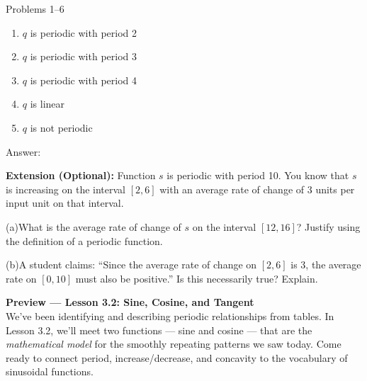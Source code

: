 \documentclass[10pt]{article}
\begin{document}
\begin{notesbox}{Problems 1--6}
\begin{enumerate}[label=(\Alph*), leftmargin=2em, itemsep=3pt]
  \item $q$ is periodic with period 2
  \item $q$ is periodic with period 3
  \item $q$ is periodic with period 4
  \item $q$ is linear
  \item $q$ is not periodic
\end{enumerate}

Answer: \underline{\hspace{1.5cm}}

\end{notesbox}

\vspace{0.08in}

\begin{extensionbox}
\textbf{Extension (Optional):} Function $s$ is periodic with period 10.
You know that $s$ is increasing on the interval $[2, 6]$ with an average
rate of change of $3$ units per input unit on that interval.

\vspace{4pt}
(a)\quad What is the average rate of change of $s$ on the interval $[12, 16]$?
Justify using the definition of a periodic function.

\vspace{4pt}
(b)\quad A student claims: ``Since the average rate of change on $[2,6]$ is 3,
the average rate on $[0, 10]$ must also be positive.'' Is this necessarily
true? Explain.
\end{extensionbox}

\vspace{0.08in}

\begin{tcolorbox}[colback=navylight, colframe=navy, arc=2mm,
    left=3mm, right=3mm, top=2mm, bottom=2mm]
\small\textbf{Preview --- Lesson 3.2: Sine, Cosine, and Tangent}\\
We've been identifying and describing periodic relationships from tables.
In Lesson 3.2, we'll meet two functions --- sine and cosine --- that are
the \emph{mathematical model} for the smoothly repeating patterns we saw
today. Come ready to connect period, increase/decrease, and concavity
to the vocabulary of sinusoidal functions.
\end{tcolorbox}
\end{document}
